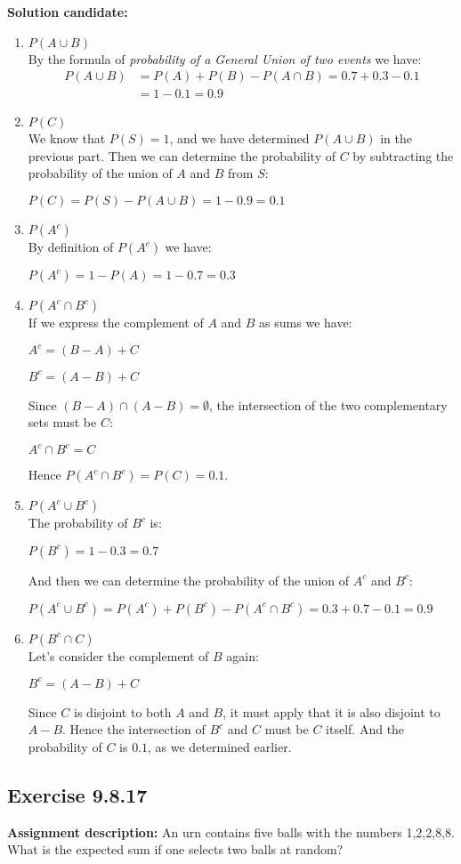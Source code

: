 \documentclass{report}
\newcommand{\cent}[1]{\begin{center}#1\end{center}}
\newcommand{\mAlign}[1]{\begin{align*}#1\end{align*}}
\newcommand{\AssignmentDescription}{\textbf{Assignment description: }}
\newcommand{\Solution}{\textbf{Solution candidate: }}
\newcommand{\QED}{\boxed{}}
\newcommand{\Exercise}[1]{\subsection{Exercise #1}}
\newcommand{\defaultEnumerateLabel}{\textbf{\alph*.}}
\newcommand{\MyItem}[1]{\item #1\\}
\newcommand{\LetterEnumeration}[1]{\begin{enumerate}[label = \defaultEnumerateLabel]
		#1
\end{enumerate}}
\begin{document}
 	\Solution
 	\LetterEnumeration{
 		\MyItem{$P(A \cup B)$}
 		By the formula of \textit{probability of a General Union of two events} we have:
 		\mAlign{
 			P(A \cup B)& = P(A) + P(B) - P(A \cap B) = 0.7 + 0.3 - 0.1\\
 			&= 1-0.1 = 0.9
 		}
 		\QED
 		
 		\MyItem{$P(C)$}
 		We know that $P(S) = 1$, and we have determined $P(A \cup B)$ in the previous part. Then we can determine the probability of $C$ by subtracting the probability of the union of $A$ and $B$ from $S$:
 		\cent{$P(C) = P(S) - P(A \cup B) = 1 - 0.9 = 0.1$}
 		
 		\QED
 		
 		\MyItem{$P(A^c)$}
 		By definition of $P(A^c)$ we have:
 		
 		\cent{$P(A^c) = 1- P(A) = 1 - 0.7 = 0.3$}
 		
 		\QED
 		
 		\MyItem{$P(A^c \cap B^c)$}
 		If we express the complement of $A$ and $B$ as sums we have:
 		
 		\cent{$A^c = (B - A) + C$}
 		\cent{$B^c = (A -B) + C$}
 		
 		Since $(B-A) \cap (A -B) = \emptyset$, the intersection of the two complementary sets must be $C$:
 		
 		\cent{$A^c \cap B^c = C$}
 		
 		Hence $P(A^c \cap B^c)  = P(C) = 0.1$.\\
 		\QED
 		
 		\MyItem{$P(A^c \cup B^c)$}
 		
 		The probability of $B^c$ is:
 		
 		\cent{$P(B^c) = 1-0.3 = 0.7$}
 		
 		And then we can determine the probability of the union of $A^c$ and $B^c$:
 		\cent{$P(A^c \cup B^c) = P(A^c) + P(B^c) - P(A^c \cap B^c) =0.3 + 0.7 -0.1 = 0.9$}
 		
 		\QED
 		
 		\MyItem{$P(B^c \cap C)$}
 		Let's consider the complement of $B$ again:
 		
 		\cent{$B^c = (A -B) + C$}
 		
 		Since $C$ is disjoint to both $A$ and $B$, it must apply that it is also disjoint to $A-B$. Hence the intersection of $B^c$ and $C$ must be $C$ itself. And the probability of $C$ is $0.1$, as we determined earlier.\\
 		\QED
 	}
 	
 	\Exercise{9.8.17}
 	\AssignmentDescription
 	An urn contains five balls with the numbers 1,2,2,8,8. What is the expected sum if one selects two balls at random?
 	
\end{document}
